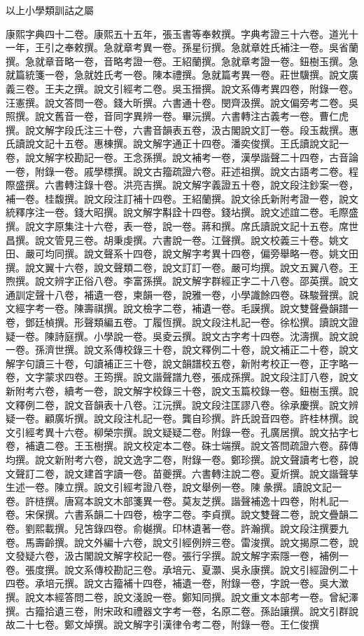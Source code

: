 \begin{pinyinscope}
以上小學類訓詁之屬

康熙字典四十二卷。康熙五十五年，張玉書等奉敕撰。字典考證三十六卷。道光十一年，王引之奉敕撰。急就章考異一卷。孫星衍撰。急就章姓氏補注一卷。吳省蘭撰。急就章音略一卷，音略考證一卷。王紹蘭撰。急就章考證一卷。鈕樹玉撰。急就篇統箋一卷，急就姓氏考一卷。陳本禮撰。急就篇考異一卷。莊世驥撰。說文廣義三卷。王夫之撰。說文引經考二卷。吳玉搢撰。說文系傳考異四卷，附錄一卷。汪憲撰。說文答問一卷。錢大昕撰。六書通十卷。閔齊汲撰。說文偏旁考二卷。吳照撰。說文舊音一卷，音同字異辨一卷。畢沅撰。六書轉注古義考一卷。曹仁虎撰。說文解字段氏注三十卷，六書音韻表五卷，汲古閣說文訂一卷。段玉裁撰。惠氏讀說文記十五卷。惠棟撰。說文解字通正十四卷。潘奕俊撰。王氏讀說文記一卷，說文解字校勘記一卷。王念孫撰。說文補考一卷，漢學諧聲二十四卷，古音論一卷，附錄一卷。戚學標撰。說文古籀疏證六卷。莊述祖撰。說文古語考二卷。程際盛撰。六書轉注錄十卷。洪亮吉撰。說文解字義證五十卷，說文段注鈔案一卷，補一卷。桂馥撰。說文段注訂補十四卷。王紹蘭撰。說文徐氏新附考證一卷，說文統釋序注一卷。錢大昭撰。說文解字斠詮十四卷。錢坫撰。說文述誼二卷。毛際盛撰。說文字原集注十六卷，表一卷，說一卷。蔣和撰。席氏讀說文記十五卷。席世昌撰。說文管見三卷。胡秉虔撰。六書說一卷。江聲撰。說文校義三十卷。姚文田、嚴可均同撰。說文聲系十四卷，說文解字考異十四卷，偏旁舉略一卷。姚文田撰。說文翼十六卷，說文聲類二卷，說文訂訂一卷。嚴可均撰。說文五翼八卷。王煦撰。說文辨字正俗八卷。李富孫撰。說文解字群經正字二十八卷。邵英撰。說文通訓定聲十八卷，補遺一卷，柬韻一卷，說雅一卷，小學識餘四卷。硃駿聲撰。說文經字考一卷。陳壽祺撰。說文檢字二卷，補遺一卷。毛謨撰。說文雙聲疊韻譜一卷，鄧廷楨撰。形聲類編五卷。丁履恆撰。說文段注札記一卷。徐松撰。讀說文證疑一卷。陳詩庭撰。小學說一卷。吳夌云撰。說文古字考十四卷。沈濤撰。說文說一卷。孫濟世撰。說文系傳校錄三十卷，說文釋例二十卷，說文補正二十卷，說文解字句讀三十卷，句讀補正三十卷，說文韻譜校五卷，新附考校正一卷，正字略一卷，文字蒙求四卷。王筠撰。說文諧聲譜九卷，張成孫撰。說文段注訂八卷，說文新附考六卷，續考一卷，說文解字校錄三十卷，說文玉篇校錄一卷。鈕樹玉撰。說文釋例二卷，說文音韻表十八卷。江沅撰。說文段注匡謬八卷。徐承慶撰。說文辨疑一卷。顧廣圻撰。說文段注札記一卷。龔自珍撰。許氏說音四卷。許桂林撰。說文引經考異十六卷。柳榮宗撰。說文疑疑二卷。附錄一卷。孔廣居撰。說文拈字七卷，補遺二卷。王玉樹撰。說文校定本二卷。硃士端撰。說文答問疏證六卷。薛傳均撰。說文新附考六卷，說文逸字二卷，附錄一卷。鄭珍撰。說文聲讀考七卷，說文聲訂二卷，說文建首字讀一卷。苗夔撰。六書轉注說二卷。夏炘撰。說文諧聲孳生述一卷。陳立撰。說文引經考證八卷，說文舉例一卷。陳彖撰。讀說文記一卷。許梿撰。唐寫本說文木部箋異一卷。莫友芝撰。諧聲補逸十四卷，附札記一卷。宋保撰。六書系韻二十四卷，檢字二卷。李貞撰。說文雙聲二卷，說文疊韻二卷。劉熙載撰。兒笘錄四卷。俞樾撰。印林遺著一卷。許瀚撰。說文段注撰要九卷。馬壽齡撰。說文外編十六卷，說文引經例辨三卷。雷浚撰。說文揭原二卷，說文發疑六卷，汲古閣說文解字校記一卷。張行孚撰。說文解字索隱一卷，補例一卷。張度撰。說文系傳校勘記三卷。承培元、夏灝、吳永康撰。說文引經證例二十四卷。承培元撰。說文古籀補十四卷，補遺一卷，附錄一卷，字說一卷。吳大澂撰。說文本經答問二卷，說文淺說一卷。鄭知同撰。說文重文本部考一卷。曾紀澤撰。古籀拾遺三卷，附宋政和禮器文字考一卷，名原二卷。孫詒讓撰。說文引群說故二十七卷。鄭文焯撰。說文解字引漢律令考二卷，附錄一卷。王仁俊撰
\end{pinyinscope}
